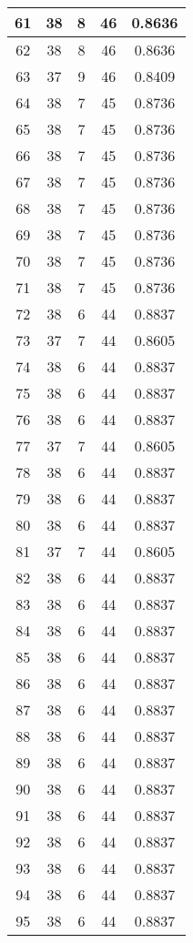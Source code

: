\documentclass[letterpaper, 12pt]{article}
\begin{document}
\begin{longtable}{|c|c|c|c|c|}
\hline
61 & 38 & 8 & 46 & 0.8636 \\
\hline
62 & 38 & 8 & 46 & 0.8636 \\
\hline
63 & 37 & 9 & 46 & 0.8409 \\
\hline
64 & 38 & 7 & 45 & 0.8736 \\
\hline
65 & 38 & 7 & 45 & 0.8736 \\
\hline
66 & 38 & 7 & 45 & 0.8736 \\
\hline
67 & 38 & 7 & 45 & 0.8736 \\
\hline
68 & 38 & 7 & 45 & 0.8736 \\
\hline
69 & 38 & 7 & 45 & 0.8736 \\
\hline
70 & 38 & 7 & 45 & 0.8736 \\
\hline
71 & 38 & 7 & 45 & 0.8736 \\
\hline
72 & 38 & 6 & 44 & 0.8837 \\
\hline
73 & 37 & 7 & 44 & 0.8605 \\
\hline
74 & 38 & 6 & 44 & 0.8837 \\
\hline
75 & 38 & 6 & 44 & 0.8837 \\
\hline
76 & 38 & 6 & 44 & 0.8837 \\
\hline
77 & 37 & 7 & 44 & 0.8605 \\
\hline
78 & 38 & 6 & 44 & 0.8837 \\
\hline
79 & 38 & 6 & 44 & 0.8837 \\
\hline
80 & 38 & 6 & 44 & 0.8837 \\
\hline
81 & 37 & 7 & 44 & 0.8605 \\
\hline
82 & 38 & 6 & 44 & 0.8837 \\
\hline
83 & 38 & 6 & 44 & 0.8837 \\
\hline
84 & 38 & 6 & 44 & 0.8837 \\
\hline
85 & 38 & 6 & 44 & 0.8837 \\
\hline
86 & 38 & 6 & 44 & 0.8837 \\
\hline
87 & 38 & 6 & 44 & 0.8837 \\
\hline
88 & 38 & 6 & 44 & 0.8837 \\
\hline
89 & 38 & 6 & 44 & 0.8837 \\
\hline
90 & 38 & 6 & 44 & 0.8837 \\
\hline
91 & 38 & 6 & 44 & 0.8837 \\
\hline
92 & 38 & 6 & 44 & 0.8837 \\
\hline
93 & 38 & 6 & 44 & 0.8837 \\
\hline
94 & 38 & 6 & 44 & 0.8837 \\
\hline
95 & 38 & 6 & 44 & 0.8837 \\

\end{longtable}
\end{document}
